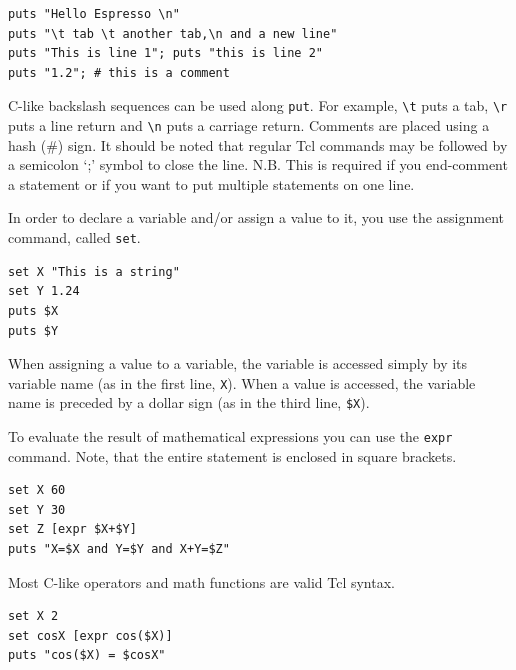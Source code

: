 \documentclass[
paper=a4,                       %
fontsize=11pt,                  %
twoside,                        %
footsepline,                    %
headsepline,                    %
headinclude=false,              %
footinclude=false,              %
pagesize,                       %
]{scrartcl}
\begin{document}
{\vspace{0,2cm}\small
\begin{lstlisting}[numbers=none]
puts "Hello Espresso \n"
puts "\t tab \t another tab,\n and a new line"
puts "This is line 1"; puts "this is line 2"
puts "1.2";	# this is a comment
\end{lstlisting}\vspace{0,2cm}
}

C-like backslash sequences can be used along \lstinline|put|. For example, \texttt{\textbackslash{}t} puts a tab, \texttt{\textbackslash{}r} puts a line return and \texttt{\textbackslash{}n} puts a carriage return. Comments are placed using a hash (\#) sign. It should be noted that regular Tcl commands may be followed by a semicolon `;' symbol to close the line. N.B. This is required if you end-comment a statement or if you want to put multiple statements on one line. 

\noindent In order to declare a variable and/or assign a value to it, you use the assignment command, called \lstinline|set|.

{\small\vspace{0,2cm}
\begin{lstlisting}[numbers=none]
set X "This is a string"
set Y 1.24
puts $X
puts $Y
\end{lstlisting}\vspace{0,2cm}
} 

\noindent When assigning a value to a variable, the variable is accessed simply by its variable name (as in the first line, \texttt{X}). When a value is accessed, the variable name is preceded by a dollar sign (as in the third line, \texttt{\$X}).

To evaluate the result of mathematical expressions you can use the \lstinline|expr| command. Note, that the entire statement is enclosed in square brackets. 

{\small\vspace{0,2cm}
\begin{lstlisting}[numbers=none]
set X 60
set Y 30
set Z [expr $X+$Y]
puts "X=$X and Y=$Y and X+Y=$Z"
\end{lstlisting}\vspace{0,2cm}
}

\noindent Most C-like operators and math functions are valid Tcl syntax.

{\small\vspace{0,2cm}
\begin{lstlisting}[numbers=none]
set X 2
set cosX [expr cos($X)]
puts "cos($X) = $cosX"
\end{lstlisting}\vspace{0,2cm}
}
\end{document}
